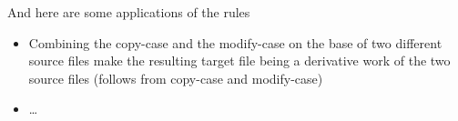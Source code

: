 And here are some applications of the rules

\begin{itemize}
  \item Combining the copy-case and the modify-case on the base of two
  different source files make the resulting target file being a derivative work
  of the two source files (follows from copy-case and modify-case)
  \item \ldots
\end{itemize}


%
